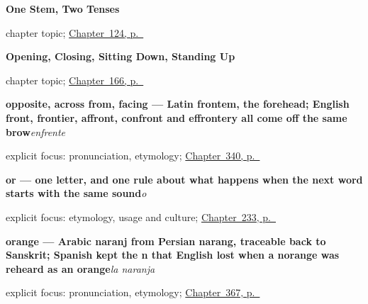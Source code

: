 \noindent\begin{minipage}[t]{\linewidth}
\raggedright
\textbf{One Stem, Two Tenses}\par
\footnotesize chapter topic; \hyperref[ch:spanish-future-conditional-stems]{Chapter~124, p.~\pageref*{ch:spanish-future-conditional-stems}}
\end{minipage}\par\smallskip

\noindent\begin{minipage}[t]{\linewidth}
\raggedright
\textbf{Opening, Closing, Sitting Down, Standing Up}\par
\footnotesize chapter topic; \hyperref[ch:spanish-open-close-sit-stand]{Chapter~166, p.~\pageref*{ch:spanish-open-close-sit-stand}}
\end{minipage}\par\smallskip

\noindent\begin{minipage}[t]{\linewidth}
\raggedright
\textbf{opposite, across from, facing — Latin frontem, the forehead; English front, frontier, affront, confront and effrontery all come off the same brow}\enspace\emph{enfrente}\par
\footnotesize explicit focus: pronunciation, etymology; \hyperref[ch:cerca-y-lejos]{Chapter~340, p.~\pageref*{ch:cerca-y-lejos}}
\end{minipage}\par\smallskip

\noindent\begin{minipage}[t]{\linewidth}
\raggedright
\textbf{or — one letter, and one rule about what happens when the next word starts with the same sound}\enspace\emph{o}\par
\footnotesize explicit focus: etymology, usage and culture; \hyperref[ch:o]{Chapter~233, p.~\pageref*{ch:o}}
\end{minipage}\par\smallskip

\noindent\begin{minipage}[t]{\linewidth}
\raggedright
\textbf{orange — Arabic naranj from Persian narang, traceable back to Sanskrit; Spanish kept the n that English lost when a norange was reheard as an orange}\enspace\emph{la naranja}\par
\footnotesize explicit focus: pronunciation, etymology; \hyperref[ch:el-desayuno-y-la-fruta]{Chapter~367, p.~\pageref*{ch:el-desayuno-y-la-fruta}}
\end{minipage}\par\smallskip

